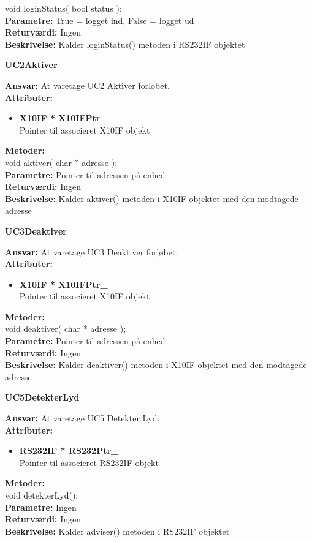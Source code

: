 void loginStatus( bool status ); \\
\textbf{Parametre:} True = logget ind, False = logget ud \\
\textbf{Returværdi:} Ingen \\
\textbf{Beskrivelse:} Kalder loginStatus() metoden i RS232IF objektet \\

%
%
{\centering
\textbf{UC2Aktiver}\par
}
\textbf{Ansvar:} At varetage UC2 Aktiver forløbet. \\
\textbf{Attributer:}
\begin{itemize}
	\item \textbf{X10IF * X10IFPtr\_} \\
	Pointer til associeret X10IF objekt
\end{itemize}
\textbf{Metoder:} \\
void aktiver( char * adresse ); \\
\textbf{Parametre:} Pointer til adressen på enhed \\
\textbf{Returværdi:} Ingen \\
\textbf{Beskrivelse:} Kalder aktiver() metoden i X10IF objektet med den modtagede adresse \\

%
%
{\centering
\textbf{UC3Deaktiver}\par
}
\textbf{Ansvar:} At varetage UC3 Deaktiver forløbet. \\
\textbf{Attributer:}
\begin{itemize}
	\item \textbf{X10IF * X10IFPtr\_} \\
	Pointer til associeret X10IF objekt
\end{itemize}
\textbf{Metoder:} \\
void deaktiver( char * adresse ); \\
\textbf{Parametre:} Pointer til adressen på enhed \\
\textbf{Returværdi:} Ingen \\
\textbf{Beskrivelse:} Kalder deaktiver() metoden i X10IF objektet med den modtagede adresse \\

%
%
{\centering
\textbf{UC5DetekterLyd}\par
}
\textbf{Ansvar:} At varetage UC5 Detekter Lyd. \\
\textbf{Attributer:}
\begin{itemize}
	\item \textbf{RS232IF * RS232Ptr\_} \\
	Pointer til associeret RS232IF objekt
\end{itemize}
\textbf{Metoder:} \\
void detekterLyd(); \\
\textbf{Parametre:} Ingen \\
\textbf{Returværdi:} Ingen \\
\textbf{Beskrivelse:} Kalder adviser() metoden i RS232IF objektet \\


